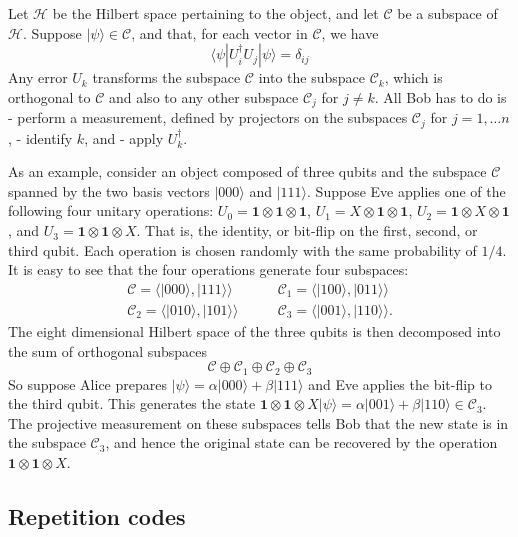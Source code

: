 \documentclass[fleqn]{article}
\begin{document}
Let \(\mathcal{H}\) be the Hilbert space pertaining to the object, and let \(\mathcal{C}\) be a subspace of \(\mathcal{H}\).
Suppose \(|\psi\rangle\in\mathcal{C}\), and that, for each vector in \(\mathcal{C}\), we have
\[
  \langle\psi|U^\dagger_i U_j|\psi\rangle = \delta_{ij}
\]
Any error \(U_k\) transforms the subspace \(\mathcal{C}\) into the subspace \(\mathcal{C}_k\), which is orthogonal to \(\mathcal{C}\) and also to any other subspace \(\mathcal{C}_j\) for \(j\neq k\).
All Bob has to do is
- perform a measurement, defined by projectors on the subspaces \(\mathcal{C}_j\) for \(j=1,\ldots n\),
- identify \(k\), and
- apply \(U_k^\dagger\).

As an example, consider an object composed of three qubits and the subspace \(\mathcal{C}\) spanned by the two basis vectors \(|000\rangle\) and \(|111\rangle\).
Suppose Eve applies one of the following four unitary operations: \(U_0=\mathbf{1}\otimes\mathbf{1}\otimes \mathbf{1}\), \(U_1 =X\otimes\mathbf{1}\otimes \mathbf{1}\), \(U_2 =\mathbf{1}\otimes X\otimes \mathbf{1}\), and \(U_3=\mathbf{1}\otimes\mathbf{1}\otimes X\).
That is, the identity, or bit-flip on the first, second, or third qubit.
Each operation is chosen randomly with the same probability of \(1/4\).
It is easy to see that the four operations generate four subspaces:
\[
  \begin{aligned}
    \mathcal{C} = \Big\langle|000\rangle,|111\rangle\Big\rangle &\qquad \mathcal{C}_1 = \Big\langle|100\rangle,|011\rangle\Big\rangle
  \\\mathcal{C}_2 = \Big\langle|010\rangle,|101\rangle\Big\rangle& \qquad \mathcal{C}_3 = \Big\langle|001\rangle,|110\rangle\Big\rangle.
  \end{aligned}
\]
The eight dimensional Hilbert space of the three qubits is then decomposed into the sum of orthogonal subspaces
\[
\mathcal{C} \oplus \mathcal{C}_1 \oplus\mathcal{C}_2 \oplus \mathcal{C}_3
\]
So suppose Alice prepares \(|\psi\rangle=\alpha|000\rangle+\beta|111\rangle\) and Eve applies the bit-flip to the third qubit.
This generates the state \(\mathbf{1}\otimes\mathbf{1}\otimes X|\psi\rangle=\alpha|001\rangle+\beta|110\rangle\in \mathcal{C}_3\).
The projective measurement on these subspaces tells Bob that the new state is in the subspace \(\mathcal{C}_3\), and hence the original state can be recovered by the operation \(\mathbf{1}\otimes\mathbf{1}\otimes X\).

\hypertarget{repetition-codes}{%
\subsection{Repetition codes}\label{repetition-codes}}
\end{document}
